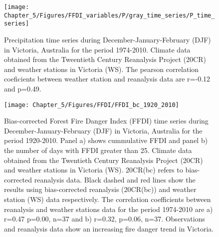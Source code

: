 \begin{figure}[H]
\noindent \begin{centering}
\texttt{[image: Chapter\_5/Figures/FFDI\_variables/P/gray\_time\_series/P\_time\_series]}
\par\end{centering}

\caption[Precipitation time series during December-January-February (DJF) in
Victoria, Australia for the period 1974-2010]{Precipitation time series during December-January-February (DJF) in
Victoria, Australia for the period 1974-2010. Climate data obtained
from the Tweentieth Century Reanalysis Project (20CR) and weather
stations in Victoria (WS). The pearson correlation coeficients between
weather station and reanalysis data are r=-0.12 and p=0.49. \label{fig:Precipitation time series during December-January-February in Victoria, Australia for the period 1974-2010}}

\end{figure}


\begin{figure}[H]
\noindent \begin{centering}
\texttt{[image: Chapter\_5/Figures/FFDI/FFDI\_bc\_1920\_2010]}
\par\end{centering}

\caption[Bias-corrected Forest Fire Danger Index (FFDI) time series during
December-January-February (DJF) in Victoria, Australia for the period
1920-2010]{Bias-corrected Forest Fire Danger Index (FFDI) time series during
December-January-February (DJF) in Victoria, Australia for the period
1920-2010. Panel a) shows cummulative FFDI and panel b) the number
of days with FFDI greater than 25. Climate data obtained from the
Twentieth Century Reanalysis Project (20CR) and weather stations
in Victoria (WS). 20CR(bc) refers to bias-corrected reanalysis data.
Black dashed and red lines show the results using bias-corrected reanalysis
(20CR(bc)) and weather station (WS) data respectively. The correlation
coefficients between reanalysis and weather stations data for the period
1974-2010 are a) r=0.47 p=0.00, n=37 and b) r=0.32, p=0.06, n=37.
Observations and reanalysis data show an increasing fire danger trend
in Victoria. \label{fig:Bias-corrected Forest Fire Danger Index (FFDI) time series during December-January-February in Victoria, Australia for the period 1920-2010}}
\end{figure}


